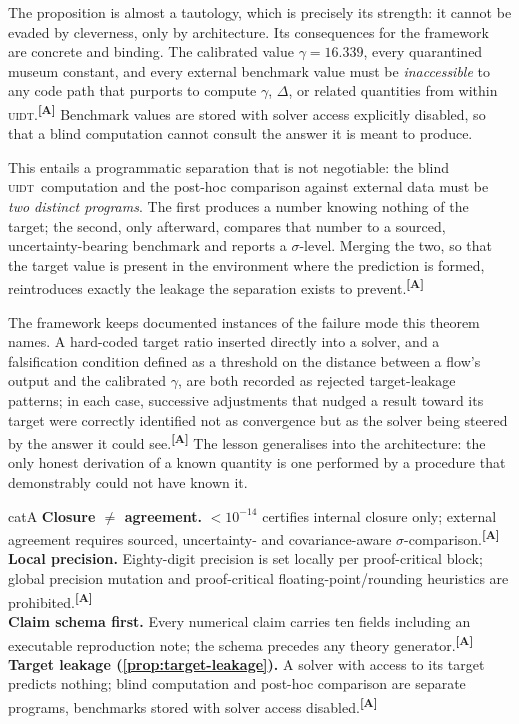 \documentclass[12pt,a4paper,twoside]{article}
\theoremstyle{plain}
\theoremstyle{definition}
\theoremstyle{remark}
\newcommand{\UIDT}{\textsc{uidt}}
\newcommand{\catmark}[1]{\textsuperscript{\textsf{\textbf{[#1]}}}}
\begin{document}
\noindent The proposition is almost a tautology, which is precisely its strength: it cannot be evaded by cleverness, only by architecture. Its consequences for the framework are concrete and binding. The calibrated value $\gamma = 16.339$, every quarantined museum constant, and every external benchmark value must be \emph{inaccessible} to any code path that purports to compute $\gamma$, $\Delta$, or related quantities from within \UIDT.\catmark{A} Benchmark values are stored with solver access explicitly disabled, so that a blind computation cannot consult the answer it is meant to produce.

This entails a programmatic separation that is not negotiable: the blind \UIDT\ computation and the post-hoc comparison against external data must be \emph{two distinct programs}. The first produces a number knowing nothing of the target; the second, only afterward, compares that number to a sourced, uncertainty-bearing benchmark and reports a $\sigma$-level. Merging the two, so that the target value is present in the environment where the prediction is formed, reintroduces exactly the leakage the separation exists to prevent.\catmark{A}

The framework keeps documented instances of the failure mode this theorem names. A hard-coded target ratio inserted directly into a solver, and a falsification condition defined as a threshold on the distance between a flow's output and the calibrated $\gamma$, are both recorded as rejected target-leakage patterns; in each case, successive adjustments that nudged a result toward its target were correctly identified not as convergence but as the solver being steered by the answer it could see.\catmark{A} The lesson generalises into the architecture: the only honest derivation of a known quantity is one performed by a procedure that demonstrably could not have known it.

\begin{evidencebox}{catA}
\textbf{Closure $\neq$ agreement.} $<10^{-14}$ certifies internal closure only; external agreement requires sourced, uncertainty- and covariance-aware
$\sigma$-comparison.\catmark{A}\\[0.3em]
\textbf{Local precision.} Eighty-digit precision is set locally per proof-critical block; global precision mutation and proof-critical
floating-point/rounding heuristics are prohibited.\catmark{A}\\[0.3em]
\textbf{Claim schema first.} Every numerical claim carries ten fields including an executable reproduction note; the schema precedes any theory
generator.\catmark{A}\\[0.3em]
\textbf{Target leakage (\cref{prop:target-leakage}).} A solver with access to its target predicts nothing; blind computation and post-hoc comparison are separate programs, benchmarks stored with solver access disabled.\catmark{A}
\end{evidencebox}
\end{document}
